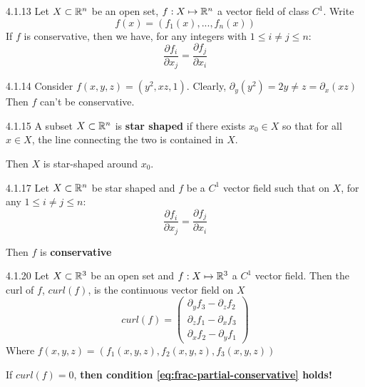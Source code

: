 \begin{proposition}{4.1.13}
    Let $X \subset \mathbb{R}^n$ be an open set, $f: X \mapsto \mathbb{R}^n$ a vector field of class $C^1$. Write
    \[ f(x) = (f_1(x), ..., f_n(x)) \]
    If $f$ is conservative, then we have, for any integers with $1 \le i \ne j \le n$:
    \[ \frac{\partial f_i}{\partial x_j} = \frac{\partial f_j}{\partial x_i} \]
\end{proposition}

\begin{example}{4.1.14}
    Consider $f(x,y,z) = (y^2, xz, 1)$.
    Clearly, $\partial_y (y^2) = 2y \ne z = \partial_x (xz)$
    Then $f$ can't be conservative.
\end{example}

\begin{definition}{4.1.15}
    A subset $X \subset \mathbb{R}^n$ is \textbf{star shaped} if there exists $x_0 \in X$ so
    that for all $x \in X$, the line connecting the two is contained in $X$.

    Then $X$ is star-shaped around $x_0$.
\end{definition}

\begin{theorem}{4.1.17}
    Let $X \subset \mathbb{R}^n$ be star shaped and $f$ be a $C^1$ vector field such that on $X$, for any $1 \le i \ne j \le n$:
    \begin{equation}
        \label{eq:frac-partial-conservative}
        \frac{\partial f_i}{\partial x_j} = \frac{\partial f_j}{\partial x_i}
    \end{equation}

    Then $f$ is \textbf{conservative}
\end{theorem}

\begin{definition}{4.1.20}
    Let $X \subset \mathbb{R}^3$ be an open set and $f: X \mapsto \mathbb{R}^3$ a $C^1$ vector field.
    Then the curl of $f$, $curl(f)$, is the continuous vector field on $X$
    \[ curl(f) = \begin{pmatrix}
            \partial_y f_3 - \partial_z f_2 \\
            \partial_z f_1 - \partial_x f_3 \\
            \partial_x f_2 - \partial_y f_1
        \end{pmatrix} \]
    Where $f(x,y,z) = (f_1(x,y,z), f_2(x,y,z), f_3(x,y,z))$

    If $curl(f) = 0$, \textbf{then condition \eqref{eq:frac-partial-conservative} holds!}
\end{definition}


